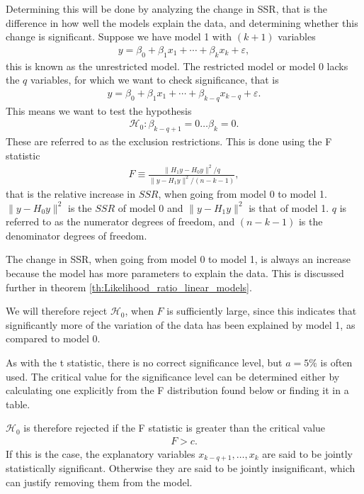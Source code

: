 Determining this will be done by analyzing the change in SSR, that is the difference in how well the models explain the data, and determining whether this change is significant. 
Suppose we have model 1 with $(k+1)$ variables 
\begin{align*}
    y = \beta_0 + \beta_1 x_1 + \cdots + \beta_k x_k + \varepsilon,
\end{align*}
this is known as the unrestricted model. The restricted model or model 0 lacks the $q$ variables, for which we want to check significance, that is
\begin{align*}
    y = \beta_0 + \beta_1 x_1 + \cdots + \beta_{k-q} x_{k-q} + \varepsilon.
\end{align*}
This means we want to test the hypothesis
\begin{align}
    \mathcal{H}_0: \beta_{k-q+1} = 0 \ldots \beta_k = 0.
\end{align}
These are referred to as the exclusion restrictions. 
This is done using the F statistic
\begin{align}\label{eq:F_test}
    F \equiv \frac{\| H_1 y - H_0 y \|^2/q}{\| y - H_1 y \|^2/(n-k-1)},
\end{align}
that is the relative increase in $SSR$, when going from model 0 to model 1. 
$\| y - H_0 y \|^2$ is the $SSR$ of model 0 and $\| y - H_1 y \|^2$ is that of model 1. 
$q$ is referred to as the numerator degrees of freedom, and $(n-k-1)$ is the denominator degrees of freedom. 

The change in SSR, when going from model 0 to model 1, is always an increase because the model has more parameters to explain the data. 
This is discussed further in theorem \ref{th:Likelihood_ratio_linear_models}.

We will therefore reject $\mathcal{H}_0$, when $F$ is sufficiently large, since this indicates that significantly more of the variation of the data has been explained by model 1, as compared to model 0.

As with the t statistic, there is no correct significance level, but $a = 5 \%$ is often used. 
The critical value for the significance level can be determined either by calculating one explicitly from the F distribution found below or finding it in a table. 

$\mathcal{H}_0$ is therefore rejected if the F statistic is greater than the critical value
\begin{align*}
    F>c.
\end{align*}
If this is the case, the explanatory variables $x_{k-q+1}, \ldots, x_k$ are said to be jointly statistically significant. Otherwise they are said to be jointly insignificant, which can justify removing them from the model. 

